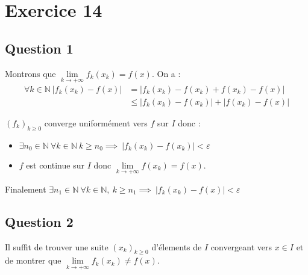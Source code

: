 \documentclass[td5.tex]{subfiles}
\begin{document}
\section{Exercice 14}

\subsection*{Question 1}
Montrons que $\lim\limits_{k \to +\infty} f_k(x_k) = f(x)$. On a :
\begin{align*}
  \forall k \in \mathbb{N}~|f_k(x_k)-f(x)| &= |f_k(x_k)-f(x_k)+f(x_k)-f(x)|\\
                                           &\leq |f_k(x_k)-f(x_k)|+|f(x_k)-f(x)|
\end{align*}


$(f_k)_{k \geq 0}$ converge uniformément vers $f$ sur $I$ donc :
\begin{itemize}
\item $\exists n_0 \in \mathbb{N} ~ \forall k \in \mathbb{N} ~ k \geq n_0 \implies~|f_k(x_k) - f(x_k)| < \varepsilon$
\item $f$ est continue sur $I$ donc $\lim\limits_{k \to +\infty} f(x_k) = f(x)$.
\end{itemize}
Finalement $\exists n_1 \in \mathbb{N} ~ \forall k \in \mathbb{N}, ~ k \geq n_1 \implies~|f_k(x_k) - f(x)| < \varepsilon$


\subsection*{Question 2}
Il suffit de trouver une suite $(x_k)_{k \geq 0}$ d'élements de $I$ convergeant vers $x \in I$ et de montrer que $\lim\limits_{k \to +\infty} f_k(x_k) \neq f(x)$.
\end{document}
